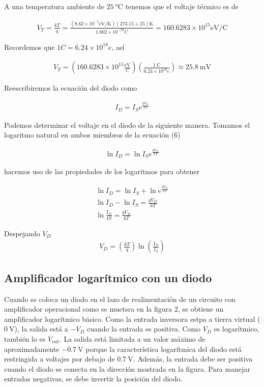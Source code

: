 \documentclass{article}
\begin{document}
\noindent A una temperatura ambiente de $\qty{25}{\degreeCelsius}$ tenemos que el voltaje térmico es de 

\begin{align}
	V_T = \frac{kT}{q} = \frac{(8.62 \times 10^{-5} \mathrm{eV}/\mathrm{K})(273.15 + 25)\mathrm{K}}{1.602 \times 10^{-19} \mathrm{C}} = 160.6283 \times 10^{15} \mathrm{eV}/\mathrm{C} \nonumber
\end{align}

\noindent Recordemos que $ 1C = 6.24 \times 10^{18} e$, así

\begin{align}
	V_T = \left( 160.6283 \times 10^{15} \frac{\mathrm{eV}}{\mathrm{C}} \right) \left( \frac{\qty{1}{\coulomb}}{6.24 \times 10^{18} e} \right) \approx \qty{25.8}{\milli \volt}
\end{align}

\noindent Reescribiremos la ecuación del diodo como

\begin{align}
	I_D = I_S e^{\frac{qV_D}{kT}}
\end{align}	

\noindent Podemos determinar el voltaje en el diodo de la siguiente manera. Tomamos el logaritmo natural en ambos miembros de la ecuación (6)

\begin{align}
	\ln I_D = \ln I_S e^{\frac{qV_D}{kT}}
\end{align}

\noindent hacemos uso de las propiedades de los logaritmos para obtener

\begin{align}
	\ln I_D = \ln I_S + \ln e^{\frac{qV_D}{kT}} \nonumber \\
	\ln I_D - \ln I_S = \frac{qV_D}{kT} \nonumber \\
	\ln \frac{I_D}{IS} = \frac{qV_D}{kT} \nonumber
\end{align}

\noindent Despejando $V_D$
\begin{align}
	V_D = \left( \frac{kT}{q} \right)  \ln \left( \frac{I_D}{I_S} \right)
\end{align}

\subsection*{Amplificador logarítmico con un diodo}
Cuando se coloca un diodo en el lazo de realimentación de un circuito con amplificador operacional como se muetsra en la figura 2, se obtiene un amplificador logarítmico básico. Como la entrada inversora estpa a tierra virtual ($\qty{0}{\volt}$), la salida está a $-V_D$ cuando la entrada es positiva. Como $V_D$ es logarítmico, también lo es $V_{out}$. La salida está limitada a un valor máximo de aproximadamente $-\qty{0.7}{\volt}$ porque la característica logarítmica del diodo está restringida a voltajes por debajo de $\qty{0.7}{\volt}$. Además, la entrada debe ser positiva cuando el diodo se conecta en la dirección mostrada en la figura. Para manejar entradas negativas, se debe invertir la posición del diodo.
\end{document}
